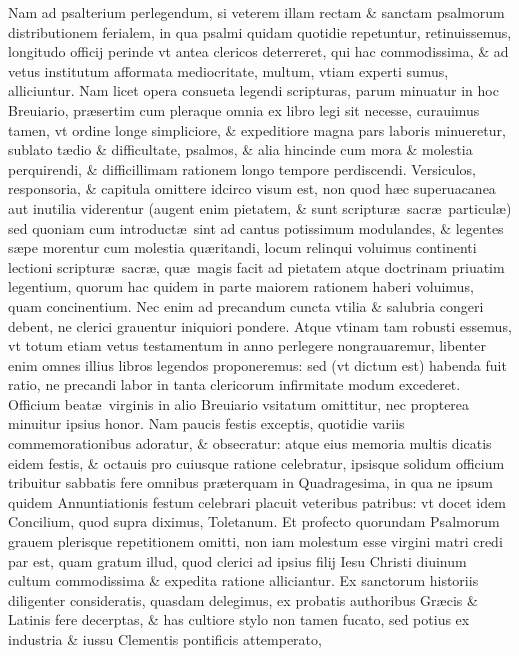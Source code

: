 \documentclass[a5paper,10pt]{book}
\def\ae{æ}
\begin{document}
Nam ad psalterium perlegendum, si veterem illam rectam \& sanctam psalmorum distributionem ferialem, in qua psalmi quidam quotidie repetuntur, retinuissemus, longitudo officij perinde vt antea clericos deterreret, qui hac commodissima, \& ad vetus institutum afformata mediocritate, multum, vtiam experti sumus, alliciuntur.
Nam licet opera consueta legendi scripturas, parum minuatur in hoc Breuiario, pr\ae sertim cum pleraque omnia ex libro legi sit necesse, curauimus tamen, vt ordine longe simpliciore, \& expeditiore magna 
pars laboris minueretur, sublato t\ae dio \& difficultate, psalmos, \& alia hincinde cum mora \& molestia perquirendi, \& difficillimam rationem longo tempore perdiscendi.
Versiculos, responsoria, \& capitula omittere idcirco visum est, non quod h\ae c superuacanea aut inutilia viderentur (augent enim pietatem, \& sunt scriptur\ae \ sacr\ae \ particul\ae ) sed quoniam %
cum introduct\ae \ sint ad cantus potissimum modulandes, \& legentes s\ae pe morentur cum molestia qu\ae ritandi, locum relinqui voluimus continenti lectioni scriptur\ae \ sacr\ae , qu\ae \ magis facit ad pietatem atque doctrinam priuatim legentium, quorum hac quidem in parte maiorem rationem haberi voluimus, quam %
concinentium.
Nec enim ad precandum cuncta vtilia \& salubria congeri debent, ne clerici grauentur iniquiori pondere.
Atque vtinam tam robusti essemus, vt totum etiam vetus testamentum in anno perlegere nongrauaremur, libenter enim omnes %
illius libros legendos proponeremus:
sed (vt dictum est) habenda fuit ratio, ne precandi labor in tanta clericorum infirmitate modum excederet.
Officium beat\ae \ virginis in alio Breuiario vsitatum omittitur, nec propterea minuitur ipsius honor.
Nam paucis festis exceptis, quotidie variis commemorationibus adoratur, \& obsecratur:
atque eius memoria multis dicatis eidem festis, \& octauis pro cuiusque ratione celebratur, ipsisque solidum officium tribuitur sabbatis fere omnibus pr\ae terquam in Quadragesima, in qua ne ipsum quidem Annuntiationis festum celebrari placuit veteribus patribus:
vt docet idem Concilium, quod supra diximus, Toletanum.
Et profecto quorundam Psalmorum grauem plerisque repetitionem omitti, non iam molestum esse virgini matri credi par est, quam %
gratum illud, quod clerici ad ipsius filij Iesu Christi diuinum cultum commodissima \& expedita ratione alliciantur.
Ex sanctorum %
historiis diligenter consideratis, quasdam delegimus, ex probatis authoribus Gr\ae cis \& Latinis fere decerptas, \& has cultiore stylo non tamen fucato, sed potius ex industria \& iussu Clementis pontificis attemperato, %
\end{document}
